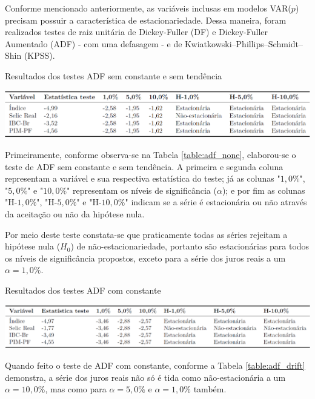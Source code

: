 Conforme mencionado anteriormente, as variáveis inclusas em modelos VAR($p$) precisam possuir a característica de estacionariedade. Dessa maneira, foram realizados testes de raiz unitária de Dickey-Fuller (DF) e Dickey-Fuller Aumentado (ADF) - com uma defasagem - e de Kwiatkowski–Phillips–Schmidt–Shin (KPSS). 

\begin{table}[hbtp]
	\centering
	\caption{Resultados dos testes ADF sem constante e sem tendência} \label{table:adf_none}
	\includegraphics[scale = 0.40]{figuras/teste_adf_none.PNG}
\end{table}

Primeiramente, conforme observa-se na Tabela \ref{table:adf_none}, elaborou-se o teste de ADF sem constante e sem tendência. A primeira e segunda coluna representam a variável e sua respectiva estatística do teste; já as colunas "$1,0\%$", "$5,0\%$" e "$10,0\%$" representam os níveis de significância ($\alpha$); e por fim as colunas "H-$1,0\%$", "H-$5,0\%$" e "H-$10,0\%$" indicam se a série é estacionária ou não através da aceitação ou não da hipótese nula. 

Por meio deste teste constata-se que praticamente todas as séries rejeitam a hipótese nula ($H_{0}$) de não-estacionariedade, portanto são estacionárias para todos os níveis de significância propostos, exceto para a série dos juros reais a um $\alpha = 1,0\%$.

\begin{table}[hbtp]
	\centering
	\caption{Resultados dos testes ADF com constante} \label{table:adf_drift}
	\includegraphics[scale = 0.40]{figuras/teste_adf_drift.PNG}
\end{table}

Quando feito o teste de ADF com constante, conforme a Tabela \ref{table:adf_drift} demonstra, a série dos juros reais não só é tida como não-estacionária a um $\alpha = 10,0\%$, mas como para $\alpha = 5,0\%$ e $\alpha = 1,0\%$ também.

